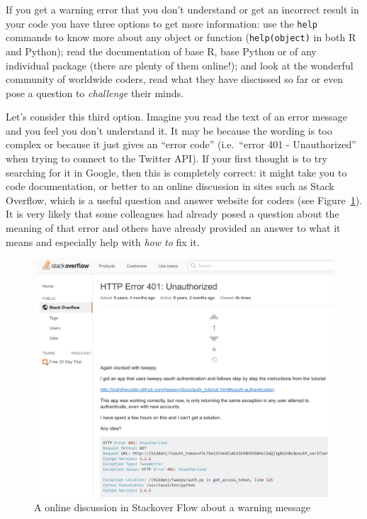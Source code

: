 
If you get a warning error that you don't understand or get an incorrect result in your code you have three options to get more information: use the \texttt{help} commands to know more about any object or function (\verb|help(object)| in both R and  Python); read the documentation of base R, base Python or of any individual package (there are plenty of them online!); and look at the wonderful community of worldwide coders, read what they have discussed so far or even pose a question to \textit{challenge} their minds.

Let's consider this third option. Imagine you read the text of an error message and you feel you don't understand it.
It may be because the wording is too complex or because it just gives an ``error code''
(i.e.\ ``error 401 - Unauthorized'' when trying to connect to the Twitter API).
If your first thought is to try searching for it in Google, then this is completely correct:
it might take you to code documentation, or better to an online discussion in sites such as Stack Overflow,
which is a useful question and answer website for coders (see Figure~\ref{fig:stackover}).
It is very likely that some colleagues had already posed a question about the meaning of that error
and others have already provided an answer to what it means and especially help with \textit{how to} fix it.

\begin{figure}
\centering
\includegraphics[width=0.9\linewidth]{figures/ch4_stackover.png}
\caption{A online discussion in Stackover Flow about a warning message }
\label{fig:stackover}
\end{figure}

